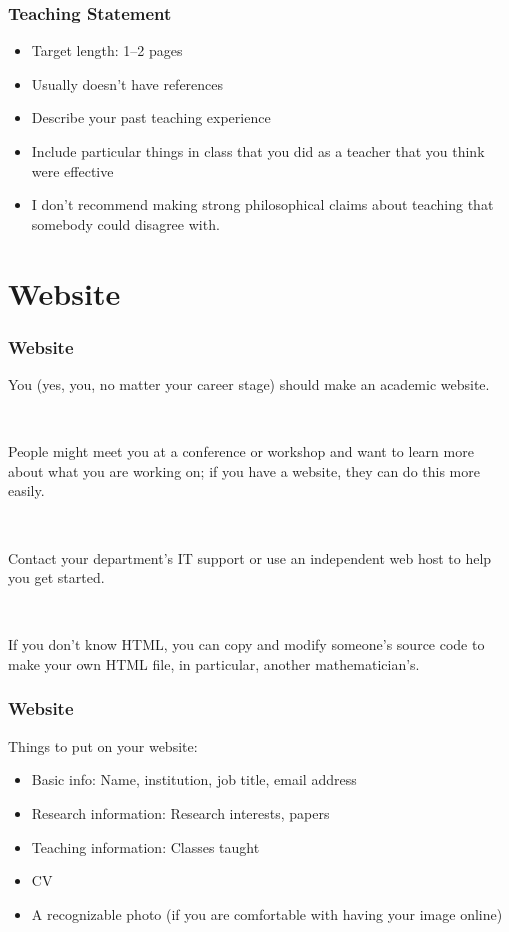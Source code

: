 \documentclass{beamer}
\begin{document}
\begin{frame}\frametitle{Teaching Statement}

\begin{itemize}
	\item Target length: 1--2 pages
	\item Usually doesn't have references
	\item Describe your past teaching experience
	\item Include particular things in class that you did as a teacher that you think were effective
	\item I don't recommend making strong philosophical claims about teaching that somebody could disagree with.
\end{itemize}

\end{frame}

\section{Website}

\begin{frame}\frametitle{Website}

You (yes, you, no matter your career stage) should make an academic website.

\

People might meet you at a conference or workshop and want to learn more about what you are working on; if you have a website, they can do this more easily.

\

Contact your department's IT support or use an independent web host to help you get started.

\

If you don't know HTML, you can copy and modify someone's source code to make your own HTML file, in particular, another mathematician's.

\end{frame}

\begin{frame}\frametitle{Website}

Things to put on your website:

\begin{itemize}
	\item Basic info: Name, institution, job title, email address
	\item Research information: Research interests, papers
	\item Teaching information: Classes taught
	\item CV
	\item A recognizable photo (if you are comfortable with having your image online)
\end{itemize}

\end{frame}
\end{document}
